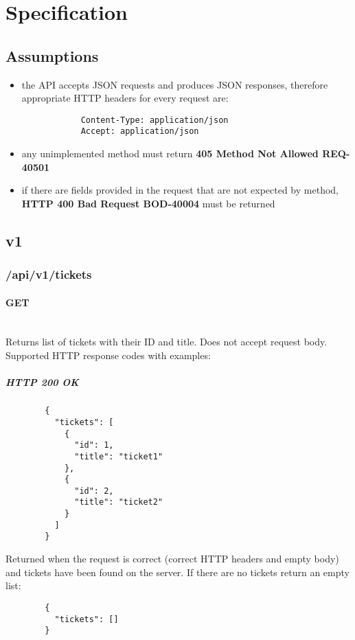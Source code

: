 \documentclass[a4paper]{article}
\newcommand{\newLineParagraph}[1]{\paragraph{#1}\mbox{}\\}
\begin{document}
    \section{Specification}

    \subsection{Assumptions}
    \begin{itemize}
        \item the API accepts JSON requests and produces JSON responses, therefore appropriate HTTP headers for every request are:
        \begin{verbatim}
            Content-Type: application/json
            Accept: application/json
        \end{verbatim}
        \item any unimplemented method must return \textbf{405 Method Not Allowed REQ-40501}
        \item if there are fields provided in the request that are not expected by method, \textbf{HTTP 400 Bad Request BOD-40004} must be returned
    \end{itemize}

    \subsection{v1}
    \subsubsection{/api/v1/tickets}
    \newLineParagraph{GET}
    Returns list of tickets with their ID and title. Does not accept request body. \\
    Supported HTTP response codes with examples:
    \subparagraph{HTTP 200 OK}
    \begin{verbatim}
        {
          "tickets": [
            {
              "id": 1,
              "title": "ticket1"
            },
            {
              "id": 2,
              "title": "ticket2"
            }
          ]
        }
    \end{verbatim}
    Returned when the request is correct (correct HTTP headers and empty body) and tickets have been found on the server. If there are no tickets return an empty list:
    \begin{verbatim}
        {
          "tickets": []
        }
    \end{verbatim}
\end{document}
